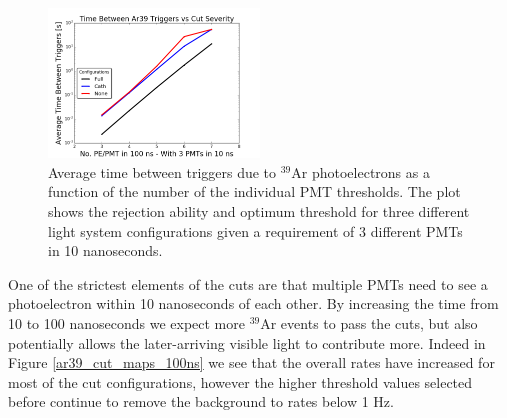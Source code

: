 \documentclass[a4paper]{article}
\begin{document}
\begin{figure}[H]
\center
\includegraphics[width=0.5\textwidth]{updated_efficiency_logy_labels.png}
\caption{Average time between triggers due to $^{39}$Ar photoelectrons as a function of the number of the individual PMT thresholds. The plot shows the rejection ability and optimum threshold for three different light system configurations given a requirement of 3 different PMTs in 10 nanoseconds.}\label{false_triggers}
\end{figure}


One of the strictest elements of the cuts are that multiple PMTs need to see a photoelectron within 10 nanoseconds of each other. By increasing the time from 10 to 100 nanoseconds we expect more $^{39}$Ar events to pass the cuts, but also potentially allows the later-arriving visible light to contribute more. Indeed in Figure \ref{ar39_cut_maps_100ns} we see that the overall rates have increased for most of the cut configurations, however the higher threshold values selected before continue to remove the background to rates below 1 Hz.
\end{document}

